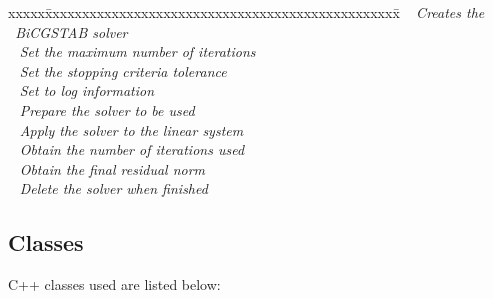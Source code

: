 \documentclass[10pt]{article}
\begin{document}
 \begin{tabbing}
xxxxx\=xxxxxxxxxxxxxxxxxxxxxxxxxxxxxxxxxxxxxxxxxxxxxxxx\=\kill
\> \done\ 
   \> \textit{Creates the \hypre\ BiCGSTAB solver} \\
\> \done\ 
   \> \textit{Set the maximum number of iterations} \\
\> \done\ 
   \> \textit{Set the stopping criteria tolerance} \\
\> \done\ 
   \> \textit{Set to log information} \\
\> \done\ 
   \> \textit{Prepare the solver to be used} \\
\> \done\ 
   \> \textit{Apply the solver to the linear system} \\
\> \done\ 
   \> \textit{Obtain the number of iterations used} \\
\> \done\ 
   \> \textit{Obtain the final residual norm} \\
\> \done\ 
   \> \textit{Delete the solver when finished}
\end{tabbing}


\subsection{Classes} \label{ss:classes}

C++ classes used are listed below:
\end{document}
